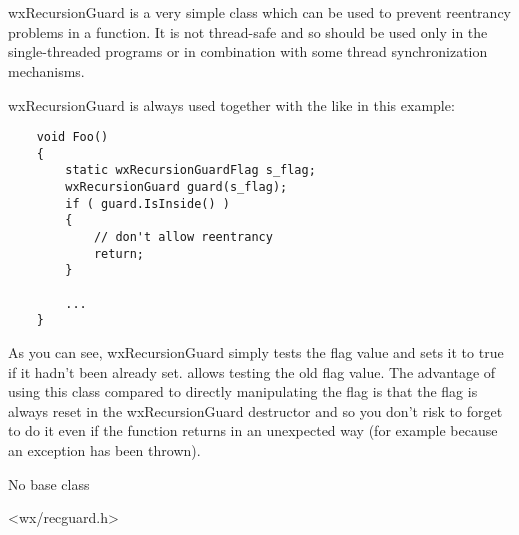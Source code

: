 
\section{}\label{wxrecursionguard}

wxRecursionGuard is a very simple class which can be used to prevent reentrancy
problems in a function. It is not thread-safe and so should be used only in the
single-threaded programs or in combination with some thread synchronization
mechanisms.

wxRecursionGuard is always used together with the 
 like in this example:
\begin{verbatim}
    void Foo()
    {
        static wxRecursionGuardFlag s_flag;
        wxRecursionGuard guard(s_flag);
        if ( guard.IsInside() )
        {
            // don't allow reentrancy
            return;
        }

        ...
    }
\end{verbatim}

As you can see, wxRecursionGuard simply tests the flag value and sets it to
true if it hadn't been already set. 
 allows testing the old flag
value. The advantage of using this class compared to directly manipulating the
flag is that the flag is always reset in the wxRecursionGuard destructor and so
you don't risk to forget to do it even if the function returns in an unexpected
way (for example because an exception has been thrown).


No base class


<wx/recguard.h>



\label{wxrecursionguardctor}


